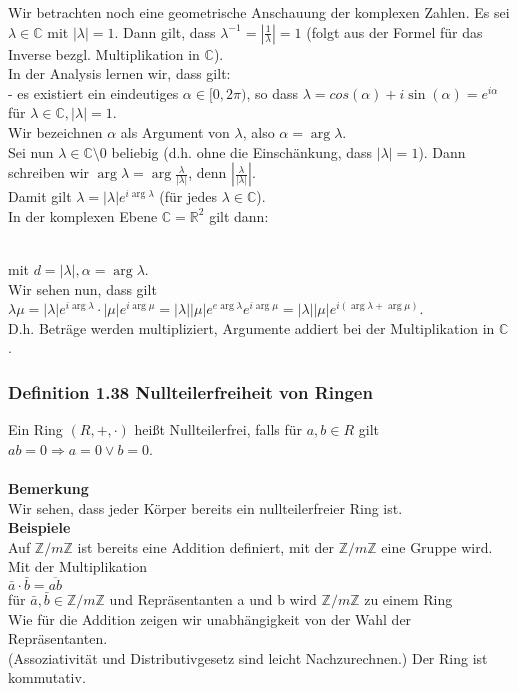 \documentclass{article}
\newcommand{\lb}{\lambda}
\newcommand{\R}{\mathbb{R}}
\newcommand{\Z}{\mathbb{Z}}
\newcommand{\C}{\mathbb{C}}
\newcommand{\mR}{$\mathbb{R}$}
\newcommand{\mC}{$\mathbb{C}$}
\newcommand{\al}{\alpha}
\begin{document}
\begin{enumerate}
{Wir betrachten noch eine geometrische Anschauung der komplexen Zahlen. Es sei $\lb \in \C$ mit $|\lb| = 1$. Dann gilt, dass $\lb^{-1} = |\frac{1}{\lb}| = 1$  (folgt aus der Formel für das Inverse bezgl. Multiplikation in \mC).\\
In der Analysis lernen wir, dass gilt:\\
- es existiert ein eindeutiges $\al \in [0, 2\pi)$, so dass $\lb = cos(\al) + i \sin(\al) = e^{i\al}$ für $\lb \in \C, |\lb| = 1$.\\
Wir bezeichnen $\al$ als Argument von $\lb$, also $\al = \arg \lb$.\\
Sei nun $\lb \in \C \setminus 0$ beliebig (d.h. ohne die Einschänkung, dass $|\lb| = 1$). Dann schreiben wir $\arg \lb = \arg \frac{\lb}{|\lb|}$, denn $|\frac{\lb}{|\lb|}|$.\\
Damit gilt $\lb = |\lb| e^{i \arg \lb}$ (für jedes $\lb \in \C$).\\
In der komplexen Ebene $\C = \R^2$ gilt dann:\\
\\
mit $d = |\lb|, \al = \arg \lb$.\\
Wir sehen nun, dass gilt $\lb \mu = |\lb| e^{i \arg \lb} \cdot  |\mu| e^{i \arg \mu} = |\lb||\mu| e^{e \arg\lb} e^{i \arg \mu} = |\lb||\mu| e^{i (\arg\lb + \arg \mu)}$.\\
D.h. Beträge werden multipliziert, Argumente addiert bei der Multiplikation in \mC.
}
\end{enumerate}

\subsubsection{Definition 1.38 Nullteilerfreiheit von Ringen}
Ein Ring $(R, +, \cdot)$ hei\ss{}t Nullteilerfrei, falls für $a, b \in R$ gilt $ab = 0 \Rightarrow a = 0 \lor b = 0$.\\
\\
\textbf{Bemerkung}\\
Wir sehen, dass jeder Körper bereits ein nullteilerfreier Ring ist.\\
\textbf{Beispiele}\\
Auf $\Z/m\Z$ ist bereits eine Addition definiert, mit der $\Z/m\Z$ eine Gruppe wird. Mit der Multiplikation\\
$\bar{a} \cdot \bar{b} = \overline{ab}$\\
für $\bar{a}, \bar{b} \in \Z / m\Z$ und Repräsentanten a und b wird $\Z/m\Z$ zu einem Ring\\
Wie für die Addition zeigen wir unabhängigkeit von der Wahl der Repräsentanten.\\
(Assoziativität und Distributivgesetz sind leicht Nachzurechnen.) Der Ring ist kommutativ.
\end{document}
